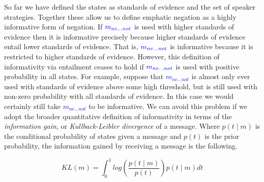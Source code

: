 \documentclass[linguex]{sp}
\theoremstyle{definition} \newtheorem{definition}{Definition}
\begin{document}

So far we have defined the states as standards of evidence and the set of speaker strategies. Together these allow us to define emphatic negation as a highly informative form of negation. If $\textcolor{blue}{m_{ne...not}}$ is used with higher standards of evidence then it is informative precisely because higher standards of evidence entail lower standards of evidence. That is, $\textcolor{blue}{m_{ne...not}}$ is informative because it is restricted to higher standards of evidence. However, this definition of informativity via entailment ceases to hold if $\textcolor{blue}{m_{ne...not}}$ is used with positive probability in all states. For example, suppose that \textcolor{blue}{$m_{ne...not}$} is almost only ever used with standards of evidence above some high threshold, but is still used with non-zero probability with all standards of evidence. In this case we would certainly still take \textcolor{blue}{$m_{ne...not}$} to be informative. We can avoid this problem if we adopt the broader quantitative definition of informativity in terms of the \emph{information gain}, or \emph{Kullback-Leibler divergence} \citeyearpar{kullback-leibler1951divergence} of a message. Where $p(t \mid m)$ is the conditional probability of states given a message and $p(t)$ is the prior probability, the information gained by receiving a message is the following.

\begin{equation}
     KL( m ) = \int_0^1 log\left( \frac{p(t \mid m )}{p(t)}  \right)p(t \mid m ) dt
\end{equation}
\end{document}
